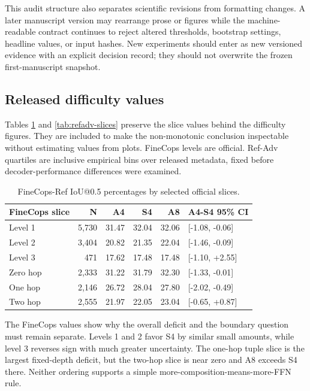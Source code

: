 \documentclass[10pt]{article}
\begin{document}
This audit structure also separates scientific revisions from formatting
changes. A later manuscript version may rearrange prose or figures while the
machine-readable contract continues to reject altered thresholds, bootstrap
settings, headline values, or input hashes. New experiments should enter as new
versioned evidence with an explicit decision record; they should not overwrite
the frozen first-manuscript snapshot.

\subsection{Released difficulty values}\label{released-difficulty-values}

Tables \ref{tab:finecops-slices} and \ref{tab:refadv-slices} preserve the slice
values behind the difficulty figures. They are included to make the
non-monotonic conclusion inspectable without estimating values from plots.
FineCops levels are official. Ref-Adv quartiles are inclusive empirical bins
over released metadata, fixed before decoder-performance differences were
examined.

\begin{table}[H]
\centering
\small
\begin{tabular}{lrrrrl}
\toprule
FineCops slice & N & A4 & S4 & A8 & A4-S4 95\% CI \\
\midrule
Level 1 & 5,730 & 31.47 & 32.04 & 32.06 & [-1.08, -0.06] \\
Level 2 & 3,404 & 20.82 & 21.35 & 22.04 & [-1.46, -0.09] \\
Level 3 & 471 & 17.62 & 17.48 & 17.48 & [-1.10, +2.55] \\
Zero hop & 2,333 & 31.22 & 31.79 & 32.30 & [-1.33, -0.01] \\
One hop & 2,146 & 26.72 & 28.04 & 27.80 & [-2.02, -0.49] \\
Two hop & 2,555 & 21.97 & 22.05 & 23.04 & [-0.65, +0.87] \\
\bottomrule
\end{tabular}
\caption{FineCops-Ref IoU@0.5 percentages by selected official slices.}
\label{tab:finecops-slices}
\end{table}

The FineCops values show why the overall deficit and the boundary question must
remain separate. Levels 1 and 2 favor S4 by similar small amounts, while level
3 reverses sign with much greater uncertainty. The one-hop tuple slice is the
largest fixed-depth deficit, but the two-hop slice is near zero and A8 exceeds
S4 there. Neither ordering supports a simple more-composition-means-more-FFN
rule.
\end{document}
